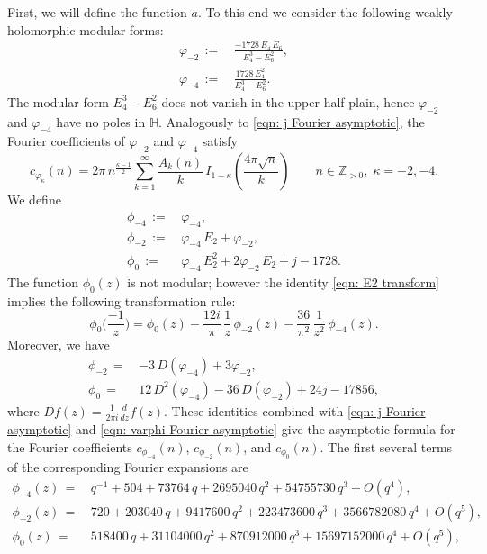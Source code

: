 \documentclass{scrartcl}
\newcommand{\Z}{\mathbb{Z}}
\newcommand{\h}{\mathbb{H}}
\begin{document}
First, we will define the function $a$. To this end we consider the following weakly holomorphic modular forms:
\begin{align} \varphi_{-2}\,:=\,&\frac{-1728 \,E_4\,E_6}{E_4^3-E_6^2},\\
 \varphi_{-4}\,:=\,&\frac{1728 \,E_4^2}{E_4^3-E_6^2}.
 \end{align}
  The modular form $E_4^3-E_6^2$ does not vanish in the upper half-plain, hence $\varphi_{-2}$ and $\varphi_{-4}$ have no poles in $\h$. Analogously to \eqref{eqn: j Fourier asymptotic}, the Fourier coefficients of $\varphi_{-2}$ and $\varphi_{-4}$ satisfy
  \begin{equation}\label{eqn: varphi Fourier asymptotic}
  c_{\varphi_\kappa}(n)=2\pi\,n^{\frac{\kappa-1}{2}}\sum_{k=1}^\infty \frac{A_k(n)}{k}\,I_{1-\kappa}\left(\frac{4\pi \sqrt{n}}{k}\right)\qquad n\in\Z_{>0},\;\kappa=-2,-4.
  \end{equation}
  We define
\begin{align}
  \phi_{-4}\,:= \,&\varphi_{-4},\label{eqn: def phi4}\\
  \phi_{-2}\,:= \,&\varphi_{-4}\,E_2+\varphi_{-2},\label{eqn: def phi2}\\
  \phi_{0}\,:= \,&\varphi_{-4}\,E_2^2+2\varphi_{-2}\,E_2+j-1728.\label{eqn: def phi0}
\end{align}
 The function $\phi_0(z)$ is not modular; however the identity \eqref{eqn: E2 transform} implies the following transformation rule:
\begin{equation}\label{eqn: phi0 transform}
\phi_0\Big(\frac{-1}{z}\Big)=\phi_0(z)-\frac{12i}{\pi}\,\frac{1}{z}\,\phi_{-2}(z)-\frac{36}{\pi^2}\,\frac{1}{z^2}\,\phi_{-4}(z).
\end{equation}
Moreover, we have
\begin{align}
\phi_{-2}\,=\,&-3\,D(\varphi_{-4})+3\varphi_{-2},\\
\phi_{0}\,=\,&12\,D^2(\varphi_{-4})-36\,D(\varphi_{-2})+24j-17856,\label{eqn: D varphi}
\end{align}
where $Df(z)=\frac{1}{2\pi i} \frac{d}{dz} f(z)$. These identities combined with \eqref{eqn: j Fourier asymptotic} and \eqref{eqn: varphi Fourier asymptotic} give the asymptotic formula for the Fourier coefficients $c_{\phi_{-4}}(n)$, $c_{\phi_{-2}}(n)$, and $c_{\phi_{0}}(n)$.
The  first several terms of the corresponding Fourier expansions are
\begin{align}
  \phi_{-4}(z)\,=\,&q^{-1} + 504 + 73764\, q + 2695040\, q^2 + 54755730\, q^3 +O(q^4),\label{eqn: phi fourier4}\\
  \phi_{-2}(z)\,=\,&720 + 203040\, q + 9417600\, q^2 + 223473600\, q^3 + 3566782080\, q^4+O(q^5),\label{eqn: phi fourier2}\\
  \phi_{0}(z)\,=\,&518400\, q + 31104000\, q^2 + 870912000\, q^3 + 15697152000\, q^4+O(q^5),\label{eqn: phi fourier0}
\end{align}
\end{document}
